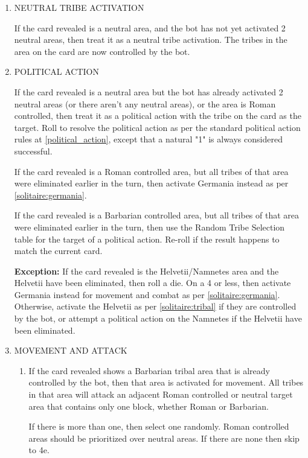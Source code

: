 \renewcommand{\labelenumii}{\alph{enumii}.}
\begin{enumerate}
  \item NEUTRAL TRIBE ACTIVATION

  If the card revealed is a neutral area, and the bot has not yet activated 2 neutral areas, then treat it as a neutral tribe activation. The tribes in the area on the card are now controlled by the bot.

  \item POLITICAL ACTION
  
  If the card revealed is a neutral area but the bot has already activated 2 neutral areas (or there aren't any neutral areas), or the area is Roman controlled, then treat it as a political action with the tribe on the card as the target. Roll to resolve the political action as per the standard political action rules at \ref{political_action}, except that a natural "1" is always considered successful.
  
  If the card revealed is a Roman controlled area, but all tribes of that area were eliminated earlier in the turn, then activate Germania instead as per \ref{solitaire:germania}.
  
  If the card revealed is a Barbarian controlled area, but all tribes of that area were eliminated earlier in the turn, then use the Random Tribe Selection table for the target of a political action. Re-roll if the result happens to match the current card.
  
  \textbf{Exception:} If the card revealed is the Helvetii/Namnetes area and the Helvetii have been eliminated, then roll a die. On a 4 or less, then activate Germania instead for movement and combat as per \ref{solitaire:germania}. Otherwise, activate the Helvetii as per \ref{solitaire:tribal} if they are controlled by the bot, or attempt a political action on the Namnetes if the Helvetii have been eliminated.

  \item MOVEMENT AND ATTACK

  \begin{enumerate}[leftmargin=0in]
    \item \label{solitaire:tribal} If the card revealed shows a Barbarian tribal area that is already controlled by the bot, then that area is activated for movement. All tribes in that area will attack an adjacent Roman controlled or neutral target area that contains only one block, whether Roman or Barbarian.
    
    If there is more than one, then select one randomly. Roman controlled areas should be prioritized over neutral areas. If there are none then skip to 4e.


\end{enumerate}
\end{enumerate}
